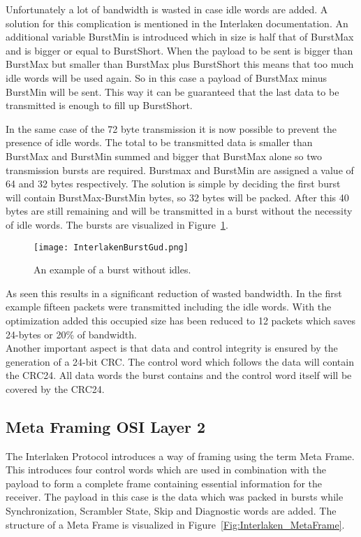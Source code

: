 	Unfortunately a lot of bandwidth is wasted in case idle words are added. A solution for this complication is mentioned in the Interlaken documentation. An additional variable BurstMin is introduced which in size is half that of BurstMax and is bigger or equal to BurstShort. When the payload to be sent is bigger than BurstMax but smaller than BurstMax plus BurstShort this means that too much idle words will be used again. So in this case a payload of BurstMax minus BurstMin will be sent. This way it can be guaranteed that the last data to be transmitted is enough to fill up BurstShort.
	
	In the same case of the 72 byte transmission it is now possible to prevent the presence of idle words. The total to be transmitted data is smaller than BurstMax and BurstMin summed and bigger that BurstMax alone so two transmission bursts are required. Burstmax and BurstMin are assigned a value of 64 and 32 bytes respectively. The solution is simple by deciding the first burst will contain BurstMax-BurstMin bytes, so 32 bytes will be packed. After this 40 bytes are still remaining and will be transmitted in a burst without the necessity of idle words. The bursts are visualized in Figure~\ref{Fig:Interlaken_Burst2}. \\
	
	\begin{figure}[H]
		\centering
		\texttt{[image: InterlakenBurstGud.png]}	
		\caption{An example of a burst without idles.}
		\label{Fig:Interlaken_Burst2}
	\end{figure}
	
	As seen this results in a significant reduction of wasted bandwidth. In the first example fifteen packets were transmitted including the idle words. With the optimization added this occupied size has been reduced to 12 packets which saves 24-bytes or 20\% of bandwidth.\\
	
	Another important aspect is that data and control integrity is ensured by the generation of a 24-bit CRC. The control word which follows the data will contain the CRC24. All data words the burst contains and the control word itself will be covered by the CRC24.
\newpage


\subsection[Meta Frame]{Meta Framing \hfill OSI Layer 2}
	\label{subsec:interlaken_metaframe}
	The Interlaken Protocol introduces a way of framing using the term Meta Frame. This introduces four control words which are used in combination with the payload to form a complete frame containing essential information for the receiver. The payload in this case is the data which was packed in bursts while Synchronization, Scrambler State, Skip and Diagnostic words are added. The structure of a Meta Frame is visualized in Figure~\ref{Fig:Interlaken_MetaFrame}.
	
